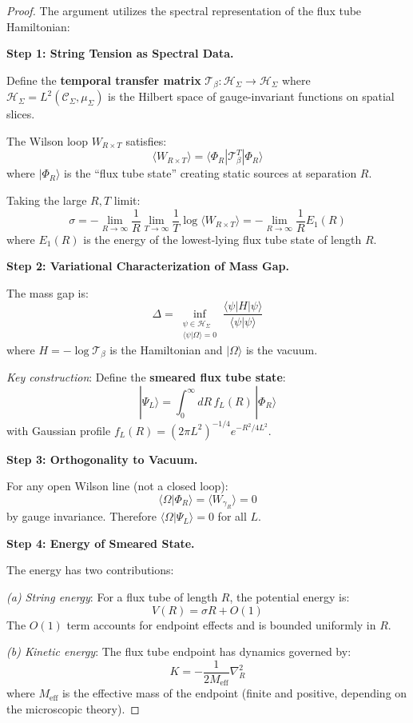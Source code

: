 \begin{proof}
The argument utilizes the spectral representation of the flux tube Hamiltonian:

\textbf{Step 1: String Tension as Spectral Data.}

Define the \textbf{temporal transfer matrix} $\mathcal{T}_\beta : \mathcal{H}_\Sigma \to \mathcal{H}_\Sigma$ 
where $\mathcal{H}_\Sigma = L^2(\mathcal{C}_\Sigma, \mu_\Sigma)$ is the Hilbert space 
of gauge-invariant functions on spatial slices.

The Wilson loop $W_{R \times T}$ satisfies:
\[
\langle W_{R \times T} \rangle = \langle \Phi_R | \mathcal{T}_\beta^T | \Phi_R \rangle
\]
where $|\Phi_R\rangle$ is the ``flux tube state'' creating static sources at 
separation $R$.

Taking the large $R, T$ limit:
\[
\sigma = -\lim_{R \to \infty} \frac{1}{R} \lim_{T \to \infty} \frac{1}{T} \log \langle W_{R \times T} \rangle
= -\lim_{R \to \infty} \frac{1}{R} E_1(R)
\]
where $E_1(R)$ is the energy of the lowest-lying flux tube state of length $R$.

\textbf{Step 2: Variational Characterization of Mass Gap.}

The mass gap is:
\[
\Delta = \inf_{\substack{\psi \in \mathcal{H}_\Sigma \\ \langle \psi | \Omega \rangle = 0}} 
\frac{\langle \psi | H | \psi \rangle}{\langle \psi | \psi \rangle}
\]
where $H = -\log \mathcal{T}_\beta$ is the Hamiltonian and $|\Omega\rangle$ is the vacuum.

\textit{Key construction}: Define the \textbf{smeared flux tube state}:
\[
|\Psi_L\rangle = \int_0^\infty dR \, f_L(R) \, |\Phi_R\rangle
\]
with Gaussian profile $f_L(R) = (2\pi L^2)^{-1/4} e^{-R^2/4L^2}$.

\textbf{Step 3: Orthogonality to Vacuum.}

For any open Wilson line (not a closed loop):
\[
\langle \Omega | \Phi_R \rangle = \langle W_{\gamma_R} \rangle = 0
\]
by gauge invariance. Therefore $\langle \Omega | \Psi_L \rangle = 0$ for all $L$.

\textbf{Step 4: Energy of Smeared State.}

The energy has two contributions:

\textit{(a) String energy}: For a flux tube of length $R$, the potential energy is:
\[
V(R) = \sigma R + O(1)
\]
The $O(1)$ term accounts for endpoint effects and is bounded uniformly in $R$.

\textit{(b) Kinetic energy}: The flux tube endpoint has dynamics governed by:
\[
K = -\frac{1}{2M_{\text{eff}}} \nabla_R^2
\]
where $M_{\text{eff}}$ is the effective mass of the endpoint (finite and 
positive, depending on the microscopic theory).


\end{proof}

